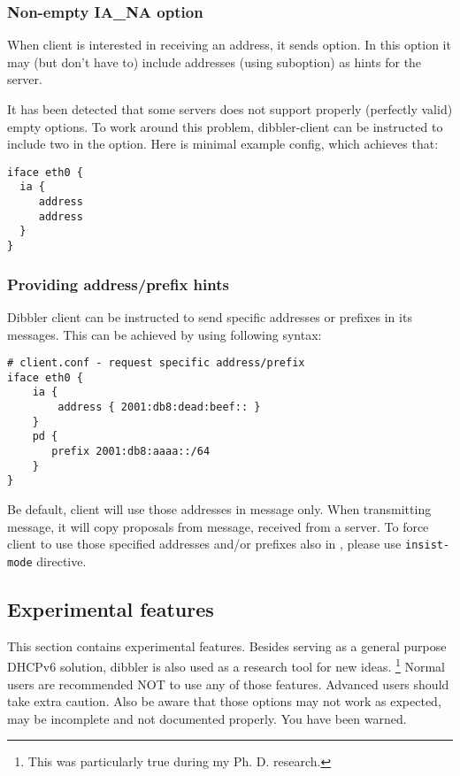 \subsubsection{Non-empty IA\_NA option}
When client is interested in receiving an address, it sends
 option. In this option it may (but don't have to) include
addresses (using  suboption) as hints for the server.

It has been detected that some servers does not support properly
(perfectly valid) empty  options. To work around this
problem, dibbler-client can be instructed to include two 
in the  option. Here is minimal example config, which
achieves that:

\begin{lstlisting}
iface eth0 {
  ia {
     address
     address
  }
}
\end{lstlisting}

\subsubsection{Providing address/prefix hints}
Dibbler client can be instructed to send specific addresses or
prefixes in its  messages. This can be achieved by using
following syntax:
\begin{lstlisting}
# client.conf - request specific address/prefix
iface eth0 {
    ia {
        address { 2001:db8:dead:beef:: }
    }
    pd {
       prefix 2001:db8:aaaa::/64
    }
}
\end{lstlisting}

Be default, client will use those addresses in  message
only. When transmitting  message, it will copy proposals
from  message, received from a server. To force client
to use those specified addresses and/or prefixes also in
, please use \verb+insist-mode+ directive.

\subsection{Experimental features}

This section contains experimental features. Besides serving as a
general purpose DHCPv6 solution, dibbler is also used as a research
tool for new ideas. \footnote{This was particularly true during my
  Ph. D. research.} Normal users are recommended NOT to use any
of those features. Advanced users should take extra caution. Also be
aware that those options may not work as expected, may be incomplete
and not documented properly. You have been warned.

